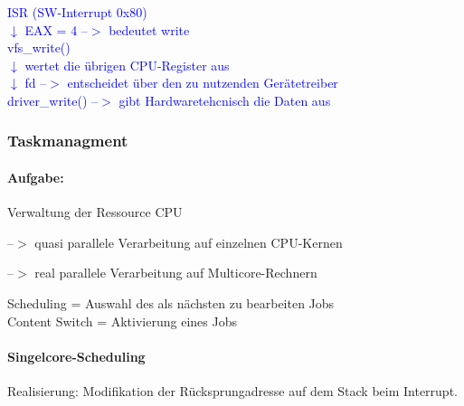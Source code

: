 \documentclass[12pt,a4paper,oneside,ngerman]{article}
\begin{document}
\textcolor{blue}{ISR (SW-Interrupt 0x80) } \\
\textcolor{blue}{$\downarrow$ EAX = 4 --$>$ bedeutet write } \\
\textcolor{blue}{vfs\_write()} \\
\textcolor{blue}{$\downarrow$ wertet die übrigen CPU-Register aus } \\
\textcolor{blue}{$\downarrow$ fd --$>$ entscheidet über den zu nutzenden Gerätetreiber } \\
\textcolor{blue}{driver\_write() --$>$ gibt Hardwaretehcnisch die Daten aus} \\

\subsubsection{Taskmanagment}
\paragraph{Aufgabe:}
Verwaltung der Ressource CPU
\begin{description}
	\item --$>$ quasi parallele Verarbeitung auf einzelnen CPU-Kernen
	\item --$>$ real parallele Verarbeitung auf Multicore-Rechnern
\end{description}
Scheduling = Auswahl des als nächsten zu bearbeiten Jobs \\
Content Switch = Aktivierung eines Jobs \\

\paragraph{Singelcore-Scheduling}
Realisierung: Modifikation der Rücksprungadresse auf dem Stack beim Interrupt.
\end{document}
